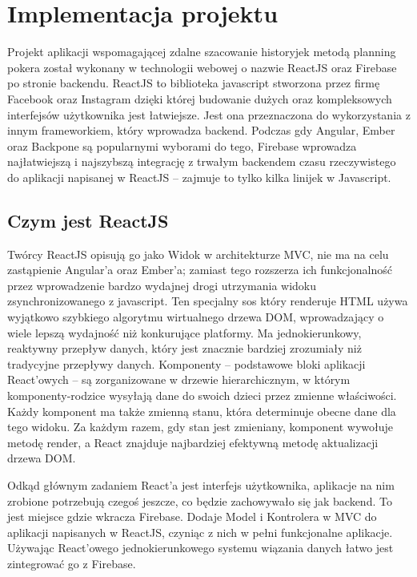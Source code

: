 
\chapter{Implementacja projektu}

Projekt aplikacji wspomagającej zdalne szacowanie historyjek metodą planning pokera został wykonany w technologii webowej
o nazwie ReactJS oraz Firebase po stronie backendu.
ReactJS to biblioteka javascript stworzona przez firmę Facebook
oraz Instagram dzięki której budowanie dużych oraz kompleksowych interfejsów użytkownika jest łatwiejsze.
Jest ona przeznaczona do wykorzystania z innym frameworkiem, który wprowadza backend.
Podczas gdy Angular, Ember oraz Backpone są popularnymi wyborami do tego,
Firebase wprowadza najłatwiejszą i najszybszą integrację z trwałym backendem
czasu rzeczywistego do aplikacji napisanej w ReactJS – zajmuje to tylko kilka linijek w Javascript. 

\section{Czym jest ReactJS}

Twórcy ReactJS opisują go jako Widok w architekturze MVC,
nie ma na celu zastąpienie Angular’a oraz Ember’a;
zamiast tego rozszerza ich funkcjonalność przez wprowadzenie bardzo wydajnej drogi utrzymania widoku zsynchronizowanego z javascript.
Ten specjalny sos który renderuje HTML używa wyjątkowo szybkiego algorytmu wirtualnego drzewa DOM,
wprowadzający o wiele lepszą wydajność niż konkurujące platformy. Ma jednokierunkowy, reaktywny przepływ danych,
który jest znacznie bardziej zrozumiały niż tradycyjne przepływy danych.
Komponenty – podstawowe bloki aplikacji React'owych – są zorganizowane w drzewie hierarchicznym,
w którym komponenty-rodzice wysyłają dane do swoich dzieci przez zmienne właściwości.
Każdy komponent ma także zmienną stanu, która determinuje obecne dane dla tego widoku.
Za każdym razem, gdy stan jest zmieniany, komponent wywołuje metodę render, a React znajduje najbardziej efektywną metodę aktualizacji drzewa DOM\@.

Odkąd głównym zadaniem React’a jest interfejs użytkownika,
aplikacje na nim zrobione potrzebują czegoś jeszcze,
co będzie zachowywało się jak backend.
To jest miejsce gdzie wkracza Firebase.
Dodaje Model i Kontrolera w MVC do aplikacji napisanych w ReactJS, czyniąc z nich w pełni funkcjonalne aplikacje.
Używając React’owego jednokierunkowego systemu wiązania danych łatwo jest zintegrować go z Firebase.\cite{www_react}

